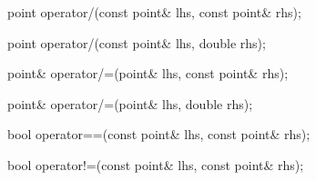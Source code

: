 %
%
\begin{itemdecl}
point operator/(const point& lhs, const point& rhs);
\end{itemdecl}
\begin{itemdescr}
	\pnum
	\returns
\end{itemdescr}

%
%
\begin{itemdecl}
point operator/(const point& lhs, double rhs);
\end{itemdecl}
\begin{itemdescr}
	\pnum
	\returns
\end{itemdescr}

%
%
\begin{itemdecl}
point& operator/=(point& lhs, const point& rhs);
\end{itemdecl}
\begin{itemdescr}
	\pnum
	\effects

	\pnum
	\returns
\end{itemdescr}

%
%
\begin{itemdecl}
point& operator/=(point& lhs, double rhs);
\end{itemdecl}
\begin{itemdescr}
	\pnum
	\effects

	\pnum
	\returns
\end{itemdescr}

%
%
\begin{itemdecl}
bool operator==(const point& lhs, const point& rhs);
\end{itemdecl}
\begin{itemdescr}
	\pnum
	\returns
\end{itemdescr}

%
%
\begin{itemdecl}
bool operator!=(const point& lhs, const point& rhs);
\end{itemdecl}
\begin{itemdescr}
	\pnum
	\returns
\end{itemdescr}
